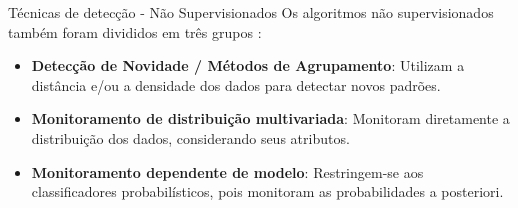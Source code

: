 \documentclass[10pt]{beamer}
\begin{document}
\begin{frame}{Técnicas de detecção - Não Supervisionados}
    Os algoritmos não supervisionados também foram divididos em três grupos \cite{GONCALVES20148144}:

    \begin{itemize}
        \item \textbf{Detecção de Novidade / Métodos de Agrupamento}: Utilizam a distância e/ou a densidade dos dados para detectar novos padrões.
        \item \textbf{Monitoramento de distribuição multivariada}: Monitoram diretamente a distribuição dos dados, considerando seus atributos.
        \item \textbf{Monitoramento dependente de modelo}: Restringem-se aos classificadores probabilísticos, pois monitoram as probabilidades a posteriori.
    \end{itemize}
\end{frame}
\end{document}
